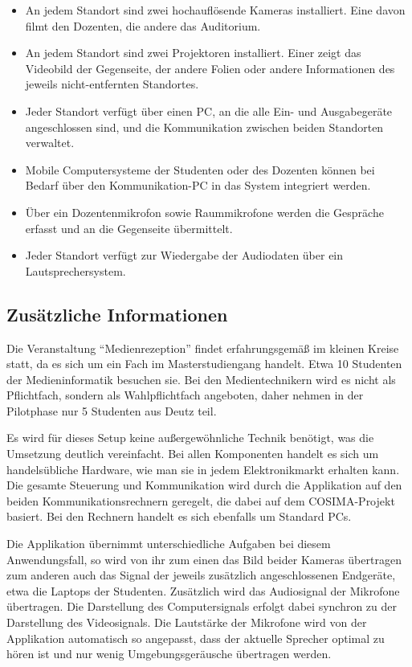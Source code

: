   \begin{itemize}
    \item An jedem Standort sind zwei hochauflösende Kameras installiert. Eine davon filmt den Dozenten, die andere das Auditorium.
    \item An jedem Standort sind zwei Projektoren installiert. Einer zeigt das Videobild der Gegenseite, der andere Folien oder andere Informationen des jeweils nicht-entfernten Standortes.
    \item Jeder Standort verfügt über einen PC, an die alle Ein- und Ausgabegeräte angeschlossen sind, und die Kommunikation zwischen beiden Standorten verwaltet.
    \item Mobile Computersysteme der Studenten oder des Dozenten können bei Bedarf über den Kommunikation-PC in das System integriert werden.
    \item Über ein Dozentenmikrofon sowie Raummikrofone werden die Gespräche erfasst und an die Gegenseite übermittelt.
    \item Jeder Standort verfügt zur Wiedergabe der Audiodaten über ein Lautsprechersystem.
  \end{itemize}
  
\subsection{Zusätzliche Informationen} %
\label{sub:zusaetzliche_informationen}

  Die Veranstaltung "`Medienrezeption"' findet erfahrungsgemäß im kleinen Kreise statt, da es sich um ein Fach im Masterstudiengang handelt. Etwa 10 Studenten der Medieninformatik besuchen sie. Bei den Medientechnikern wird es nicht als Pflichtfach, sondern als Wahlpflichtfach angeboten, daher nehmen in der Pilotphase nur 5 Studenten aus Deutz teil.

  Es wird für dieses Setup keine außergewöhnliche Technik benötigt, was die Umsetzung deutlich vereinfacht. Bei allen Komponenten handelt es sich um handelsübliche Hardware, wie man sie in jedem Elektronikmarkt erhalten kann. Die gesamte Steuerung und Kommunikation wird durch die Applikation auf den beiden Kommunikationsrechnern geregelt, die dabei auf dem COSIMA-Projekt basiert. Bei den Rechnern handelt es sich ebenfalls um Standard PCs.

  Die Applikation übernimmt unterschiedliche Aufgaben bei diesem Anwendungsfall, so wird von ihr zum einen das Bild beider Kameras übertragen zum anderen auch das Signal der jeweils zusätzlich angeschlossenen Endgeräte, etwa die Laptops der Studenten. Zusätzlich wird das Audiosignal der Mikrofone übertragen. Die Darstellung des Computersignals erfolgt dabei synchron zu der Darstellung des Videosignals. Die Lautstärke der Mikrofone wird von der Applikation automatisch so angepasst, dass der aktuelle Sprecher optimal zu hören ist und nur wenig Umgebungsgeräusche übertragen werden.

